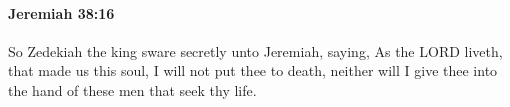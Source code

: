 
		\paragraph{Jeremiah 38:16} %
			\label{JEREMIAH-38-16}

			So Zedekiah the king sware secretly unto Jeremiah, saying, As the LORD liveth, that made us this soul, I will not put thee to death, neither will I give thee into the hand of these men that seek thy life.


